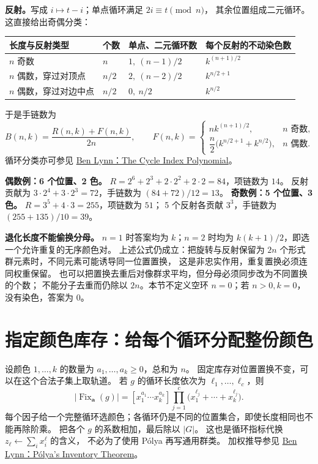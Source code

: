 \textbf{反射。}写成 $i\mapsto t-i$；单点循环满足 $2i\equiv t\pmod n$，
其余位置组成二元循环。这直接给出奇偶分类：
\begin{center}
\begin{tabular}{llll}
\toprule
长度与反射类型 & 个数 & 单点、二元循环数 & 每个反射的不动染色数\\
\midrule
$n$ 奇数 & $n$ & $1,\ (n-1)/2$ & $k^{(n+1)/2}$\\
$n$ 偶数，穿过对顶点 & $n/2$ & $2,\ (n-2)/2$ & $k^{n/2+1}$\\
$n$ 偶数，穿过对边中点 & $n/2$ & $0,\ n/2$ & $k^{n/2}$\\
\bottomrule
\end{tabular}
\end{center}
于是手链数为
\[
B(n,k)=\frac{R(n,k)+F(n,k)}{2n},\qquad
F(n,k)=\begin{cases}
nk^{(n+1)/2},&n\text{ 奇数},\\
\dfrac n2\bigl(k^{n/2+1}+k^{n/2}\bigr),&n\text{ 偶数}.
\end{cases}
\]
循环分类亦可参见 \href{https://theory.stanford.edu/~blynn/polya/cycleindex.html}{Ben Lynn：The Cycle Index Polynomial}。

\textbf{偶数例：6 个位置、2 色。}
$R=2^6+2^3+2\cdot2^2+2\cdot2=84$，项链数为 $14$。
反射贡献为 $3\cdot2^4+3\cdot2^3=72$，手链数为 $(84+72)/12=13$。
\textbf{奇数例：5 个位置、3 色。}
$R=3^5+4\cdot3=255$，项链数为 $51$；
5 个反射各贡献 $3^3$，手链数为 $(255+135)/10=39$。

\textbf{退化长度不能偷换分母。}
$n=1$ 时答案均为 $k$；$n=2$ 时均为 $k(k+1)/2$，即选一个允许重复的无序颜色对。
上述公式仍成立：把旋转与反射保留为 $2n$ 个形式群元素时，不同元素可能诱导同一位置置换，
这是非忠实作用，重复置换必须连同权重保留。
也可以把置换去重后对像群求平均，但分母必须同步改为不同置换的个数；
不能分子去重而仍除以 $2n$。本节不定义空环 $n=0$；若 $n>0,k=0$，没有染色，答案为 0。

\section{指定颜色库存：给每个循环分配整份颜色}\label{knowledge-orbits-inventory}
设颜色 $1,\ldots,k$ 的数量为 $a_1,\ldots,a_k\ge0$，总和为 $n$。
固定库存对位置置换不变，可以在这个合法子集上取轨道。
若 $g$ 的循环长度依次为 $\ell_1,\ldots,\ell_c$，则
\[
|\operatorname{Fix}_{\boldsymbol a}(g)|=
[x_1^{a_1}\cdots x_k^{a_k}]
\prod_{j=1}^{c}\bigl(x_1^{\ell_j}+\cdots+x_k^{\ell_j}\bigr).
\]
每个因子给一个完整循环选颜色；各循环仍是不同的位置集合，即使长度相同也不能再除阶乘。
把各个 $g$ 的系数相加，最后除以 $|G|$。
这也是循环指标代换 $z_\ell\leftarrow\sum_i x_i^\ell$ 的含义，
不必为了使用 P\'olya 再写通用群类。
加权推导参见 \href{https://theory.stanford.edu/~blynn/polya/polya.html}{Ben Lynn：P\'olya's Inventory Theorem}。


